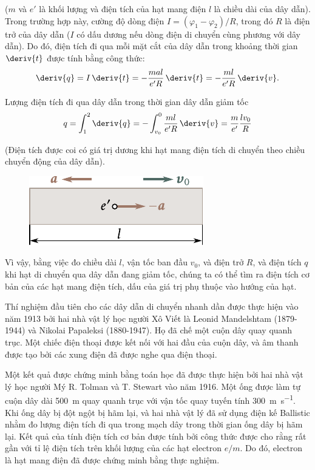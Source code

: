 \noindent
($m$ và $e'$ là khối lượng và điện tích của hạt mang điện $l$ là chiều dài của dây dẫn).
Trong trường hợp này, cường độ dòng điện $I = (\varphi_1 - \varphi_2)/R$, trong đó  $R$ là điện trở của dây dẫn ($I$ có dấu dương nếu dòng điện di chuyển cùng phương với dây dẫn).
Do đó, điện tích đi qua mỗi mặt cắt của dây dẫn trong khoảng thời gian $\deriv{t}$ được tính bằng công thức:
\begin{equation*}
    \deriv{q} = I\, \deriv{t} = - \frac{mal}{e'R}\, \deriv{t} = - \frac{ml}{e'R}\, \deriv{v}.
\end{equation*}

\noindent
Lượng điện tích đi qua dây dẫn trong thời gian dây dẫn giảm tốc
\begin{equation}\label{eq:11_1}
    q = \int_1^2 \deriv{q} = - \int_{v_0}^0 \frac{ml}{e'R}\, \deriv{v} = \frac{m}{e'} \frac{lv_0}{R}
\end{equation}

\noindent
(Điện tích được coi có giá trị dương khi hạt mang điện tích di chuyển theo chiều chuyển động của dây dẫn).

\begin{figure}[!htb]
	\begin{center}
		\includegraphics[scale=1]{figures/ch_11/fig_11_1.pdf}
		\caption[]{}
		\label{fig:11_1}
	\end{center}
	\vspace{-0.8cm}
\end{figure}

Vì vậy, bằng việc đo chiều dài $l$, vận tốc ban đầu $v_0$, và điện trở  $R$, và điện tích $q$ khi hạt di chuyển qua dây dẫn đang giảm tốc, chúng ta có thể tìm ra điện tích cơ bản của các hạt mang điện tích, dấu của giá trị phụ thuộc vào hướng của hạt.

Thí nghiệm đầu tiên cho các dây dẫn di chuyển nhanh dần được thực hiện vào năm 1913 bởi hai nhà vật lý học người Xô Viết là Leonid Mandelshtam (1879-1944) và Nikolai Papaleksi (1880-1947).
Họ đã chế một cuộn dây quay quanh trục. Một chiếc điện thoại được kết nối với hai đầu của cuộn dây, và âm thanh được tạo bởi các xung điện đã được nghe qua điện thoại.

Một kết quả được chứng minh bằng toán học đã được thực hiện bởi hai nhà vật lý học người Mý R. Tolman và T. Stewart vào năm 1916. Một ống được làm tự cuộn dây dài \SI{500}{\metre} quay quanh trục với vận tốc quay tuyến tính \SI{300}{\metre\per\second}.
Khi ống dây bị đột ngột bị hãm lại, và hai nhà vật lý đã sử dụng điện kế Ballistic  nhằm đo lượng điện tích đi qua trong mạch dây trong thời gian ống dây bị hãm lại.
Kết quả của tính điện tích cơ bản được tính bởi công thức  được cho rằng rất gần với tỉ lệ điện tích trên khối lượng của các hạt electron $e/m$.
Do đó, electron là hạt mang điện đã được chứng minh bằng thực nghiệm.

